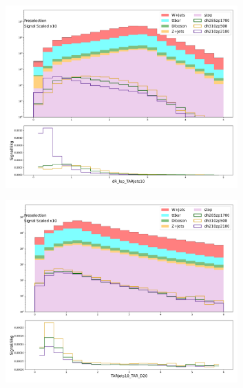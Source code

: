 \begin{figure}[htbp]
\begin{subfigure}{0.49\textwidth}
     \caption{\metsig}
     \end{subfigure}
     \begin{subfigure}{0.49\textwidth}
     \includegraphics[width = 0.98\textwidth]{Figures/appendix/Preselection/dR_lep_TARJets10.png}
     \caption{\drTARl}
     \end{subfigure}
     \begin{subfigure}{0.49\textwidth}
     \includegraphics[width = 0.98\textwidth]{Figures/appendix/Preselection/TARJets10_TAR_D20.png}
     \caption{\DtwoTAR}
     \end{subfigure}
     \begin{subfigure}{0.49\textwidth}

\end{subfigure}
\end{figure}
